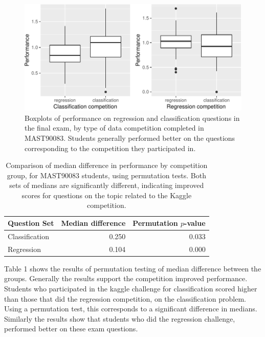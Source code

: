 \documentclass[12pt]{article}
\begin{document}
\begin{figure}
\centering
\includegraphics{paper-kaggle_files/figure-latex/Melb-1.pdf}
\caption{\label{fig:MAST90083} Boxplots of performance on regression and
classification questions in the final exam, by type of data competition
completed in MAST90083. Students generally performed better on the
questions corresponding to the competition they participated in.}
\end{figure}

\begin{table}[h]
\begin{center}
\begin{tabular}{|l|r|r|}\hline
Question Set & Median difference & Permutation $p$-value \\\hline
Classification & 0.250 & 0.033\\
Regression & 0.104 & 0.000\\\hline
\end{tabular}
\caption{Comparison of median difference in performance by competition group, for MAST90083 students, using permutation tests. Both sets of medians are significantly different, indicating improved scores for questions on the topic related to the Kaggle competition.}
\end{center}
\label{tab:Melb_Perm}
\end{table}

Table 1 shows the results of permutation testing of median difference
between the groups. Generally the results support the competition
improved performance. Students who participated in the kaggle challenge
for classification scored higher than those that did the regression
competition, on the classification problem. Using a permutation test,
this corresponds to a significant difference in medians. Similarly the
results show that students who did the regression challenge, performed
better on these exam questions.
\end{document}
